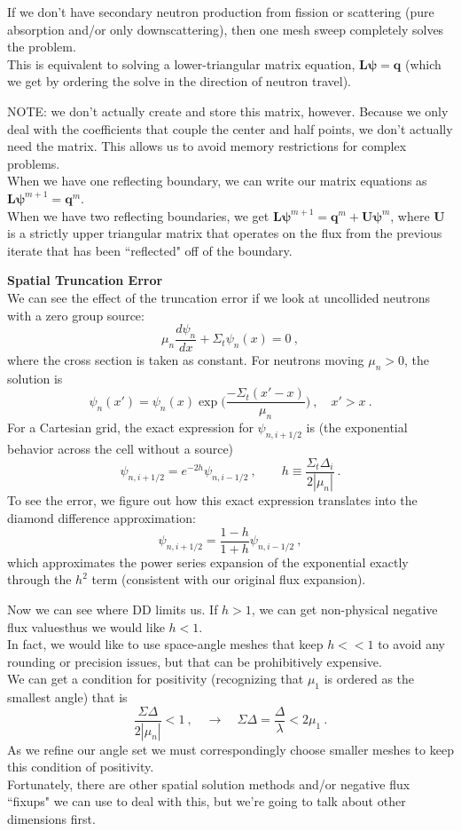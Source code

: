 \documentclass[12pt]{article}
\begin{document}
If we don't have secondary neutron production from fission or scattering (pure absorption and/or only downscattering), then one mesh sweep completely solves the problem. \\
This is equivalent to solving a lower-triangular matrix equation, $\mathbf{L}\mathbf{\psi} = \mathbf{q}$ (which we get by ordering the solve in the direction of neutron travel).

NOTE: we don't actually create and store this matrix, however. Because we only deal with the coefficients that couple the center and half points, we don't actually need the matrix.   This allows us to avoid memory restrictions for complex problems. \\
When we have one reflecting boundary, we can write our matrix equations as $\mathbf{L}\mathbf{\psi}^{m+1} = \mathbf{q}^m$.\\
When we have two reflecting boundaries, we get $\mathbf{L}\mathbf{\psi}^{m+1} = \mathbf{q}^m + \mathbf{U}\mathbf{\psi}^{m}$, where $\mathbf{U}$ is a strictly upper triangular matrix that operates on the flux from the previous iterate that has been ``reflected" off of the boundary.

\textbf{Spatial Truncation Error}\\
We can see the effect of the truncation error if we look at uncollided neutrons with a zero group source:
\[
\mu_n \frac{d \psi_n}{dx} + \Sigma_t \psi_n(x) = 0\:,
\]
where the cross section is taken as constant. For neutrons moving $\mu_n > 0$, the solution is
\[
\psi_n(x') = \psi_n(x)\exp\bigl(\frac{-\Sigma_t (x'-x)}{\mu_n}\bigr)\:, \quad x' > x \:.
\]
For a Cartesian grid, the exact expression for $\psi_{n,i+1/2}$ is (the exponential behavior across the cell without a source)
\[
\psi_{n,i+1/2} = e^{-2h} \psi_{n,i-1/2}\:, \qquad h \equiv \frac{\Sigma_t \Delta_i}{2|\mu_n|} \:.
\]
To see the error, we figure out how this exact expression translates into the diamond difference approximation:
\[
\psi_{n,i+1/2} = \frac{1 - h}{1 + h}\psi_{n,i-1/2}\:,
\]
which approximates the power series expansion of the exponential exactly through the $h^2$ term (consistent with our original flux expansion). 

Now we can see where DD limits us. If $h > 1$, we can get non-physical negative flux values\textemdash thus we would like $h < 1$. \\
In fact, we would like to use space-angle meshes that keep $h<<1$ to avoid any rounding or precision issues, but that can be prohibitively expensive. \\
We can get a condition for positivity (recognizing that $\mu_1$ is ordered as the smallest angle) that is 
\[
\frac{\Sigma \Delta}{2|\mu_n|} < 1 \:, \quad \rightarrow \quad \Sigma \Delta = \frac{\Delta}{\lambda} < 2 \mu_1\:.
\]
As we refine our angle set we must correspondingly choose smaller meshes to keep this condition of positivity.\\
Fortunately, there are other spatial solution methods and/or negative flux ``fixups" we can use to deal with this, but we're going to talk about other dimensions first. 
\end{document}
